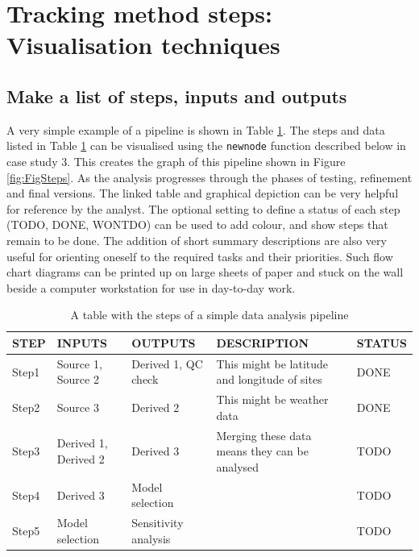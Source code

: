 \documentclass[11pt,a4paper]{article}
\begin{document}
\clearpage

\section{Tracking method steps: Visualisation techniques}\label{visualisation-techniques}

\subsection{Make a list of steps, inputs and
outputs}\label{make-a-list-of-steps-inputs-and-outputs}

A very simple example of a pipeline is shown in Table
\ref{tab:TablePipe1}. The steps and data listed in Table
\ref{tab:TablePipe1} can be visualised using the \texttt{newnode}
function described below in case study 3. This creates the graph of this
pipeline shown in Figure \ref{fig:FigSteps}. As the analysis progresses
through the phases of testing, refinement and final versions. The linked
table and graphical depiction can be very helpful for reference by the
analyst. The optional setting to define a status of each step (TODO,
DONE, WONTDO) can be used to add colour, and show steps that remain to
be done. The addition of short summary descriptions are also very useful
for orienting oneself to the required tasks and their priorities. Such
flow chart diagrams can be printed up on large sheets of paper and stuck
on the wall beside a computer workstation for use in day-to-day work.

\begin{table}[!ht]
\centering
\caption{A table with the steps of a simple data analysis pipeline} 
\label{tab:TablePipe1}
\begin{tabular}{p{.6in}p{1.3in}p{1.2in}p{2in}p{1in}}
  \hline
STEP & INPUTS & OUTPUTS & DESCRIPTION & STATUS \\ 
  \hline
Step1 & Source 1, Source 2 & Derived 1, QC check & This might be latitude and longitude of sites & DONE \\ 
  Step2 & Source 3 & Derived 2 & This might be weather data & DONE \\ 
  Step3 & Derived 1, Derived 2 & Derived 3 & Merging these data means they can be analysed & TODO \\ 
  Step4 & Derived 3 & Model selection &  & TODO \\ 
  Step5 & Model selection & Sensitivity analysis &  & TODO \\ 
   \hline
\end{tabular}
\end{table}
\end{document}
